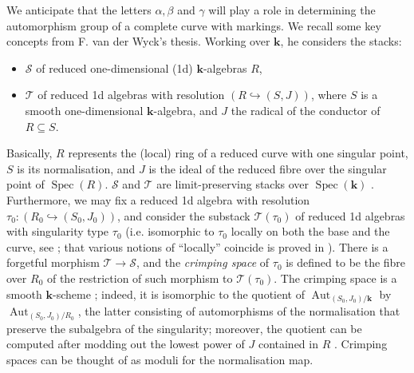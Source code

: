 \documentclass[11pt]{amsart}
\renewcommand{\k}{\mathbf k}
\renewcommand{\to}{\rightarrow}
\newcommand{\Aut}{\operatorname{Aut}}
\theoremstyle{plain}
\theoremstyle{definition}
\begin{document}
We anticipate that the letters $\alpha,\beta$ and $\gamma$ will play a role in determining the automorphism group of a complete curve with markings. We recall some key concepts from F. van der Wyck's thesis.
Working over $\k$, he considers the stacks:
\begin{itemize}[leftmargin=.5cm]
 \item $\mathcal S$ of reduced one-dimensional (1d) $\k$-algebras $R$,
 \item $\mathcal T$ of reduced 1d algebras with resolution $(R\hookrightarrow (S,J))$, where $S$ is a smooth one-dimensional $\k$-algebra, and $J$ the radical of the conductor of $R\subseteq S$.
\end{itemize}
  Basically, $R$ represents the (local) ring of a reduced curve with one singular point, $S$ is its normalisation, and $J$ is the ideal of the reduced fibre over the singular point of $\operatorname{Spec}(R)$. $\mathcal S$ and $\mathcal T$ are limit-preserving stacks over $\operatorname{Spec}(\k)$ \cite[Proposition 1.21]{vdW}. Furthermore, we may fix a reduced 1d algebra with resolution $\tau_0:(R_0\hookrightarrow(S_0,J_0))$, and consider the substack $\mathcal T(\tau_0)$ of reduced 1d algebras with singularity type $\tau_0$ (i.e. isomorphic to $\tau_0$ locally on both the base and the curve, see \cite[Definition 1.64]{vdW}; that various notions of ``locally'' coincide is proved in \cite[Proposition 1.50]{vdW}). There is a forgetful morphism $\mathcal T\to\mathcal S$, and the \emph{crimping space} of $\tau_0$ is defined to be the fibre over $R_0$ of the restriction of such morphism to $\mathcal T(\tau_0)$. The crimping space is a smooth $\k$-scheme \cite[Theorems 1.70 and 1.73]{vdW}; indeed, it is isomorphic to the quotient of $\Aut_{(S_0,J_0)/\k}$ by $\Aut_{(S_0,J_0)/R_0}$, the latter consisting of automorphisms of the normalisation that preserve the subalgebra of the singularity; moreover, the quotient can be computed after modding out the lowest power of $J$ contained in $R$ \cite[Theorem 1.53]{vdW}. Crimping spaces can be thought of as moduli for the normalisation map.
  
\end{document}
